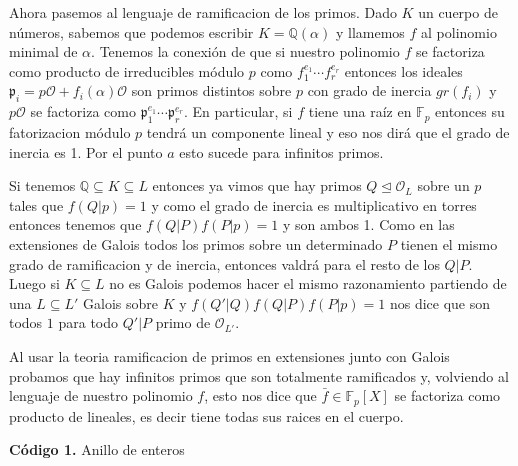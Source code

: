 \documentclass[12pt]{amsart}
\newcommand{\QQ}{\mathbb{Q}}
\newcommand{\FF}{\mathbb{F}}
\newcommand{\pp}{\mathfrak{p}}
\newcommand{\OO}{\mathcal{O}}
\theoremstyle{plain}
\begin{document}
Ahora pasemos al lenguaje de ramificacion de los primos. Dado $K$ un cuerpo de 
números, sabemos que podemos escribir $K=\QQ(\alpha)$ y llamemos $f$ al
polinomio minimal de $\alpha$. Tenemos la
conexión de que si nuestro polinomio $f$ se factoriza como 
producto de irreducibles módulo $p$ como $f_1^{e_1}\cdots f_r^{e_r}$ 
entonces los ideales $\pp_i = p\OO + f_i(\alpha)\OO$ son primos distintos
sobre $p$ con grado de inercia $gr(f_i)$ y $p\OO$ se factoriza como
$\pp_1^{e_1}\cdots \pp_r^{e_r}$. En particular, si $f$ tiene una raíz 
en $\FF_p$ entonces su fatorizacion módulo $p$ tendrá un componente 
lineal y eso nos dirá que el grado de inercia es 1. Por el punto $a$ esto
sucede para infinitos primos.

Si tenemos $\QQ\subseteq K\subseteq L$ entonces ya vimos que hay primos
$Q \unlhd \OO_L$ sobre un $p$ tales que $f(Q | p)=1$ y como el grado 
de inercia es multiplicativo en torres entonces 
tenemos que $f(Q | P)f(P|p)=1$ y son ambos 1. Como en las extensiones de 
Galois todos los primos sobre un determinado $P$ tienen el mismo grado 
de ramificacion y de inercia, entonces valdrá para el resto de los $Q|P$.
Luego si $K\subseteq L$ no es Galois podemos hacer el mismo razonamiento
partiendo de una $L\subseteq L'$ Galois sobre $K$ y $f(Q' | Q)f(Q | P)
f(P|p)=1$ nos dice que son todos $1$ para todo $Q'|P$ primo de $\OO_{L'}$.

Al usar la teoria ramificacion de primos en extensiones junto con Galois probamos que hay infinitos primos que son totalmente ramificados y, volviendo al lenguaje de nuestro polinomio $f$, esto nos dice que $\bar{f}\in \FF_p[X]$ se factoriza como producto de lineales, es decir tiene todas sus raices en el cuerpo.







\newpage

\vspace{1em}
\noindent\textbf{Código 1.} Anillo de enteros
\label{codigo1}

\lstset{
    language=Python,
    basicstyle=\ttfamily\small,
    frame=single,
    breaklines=true
}
\end{document}

